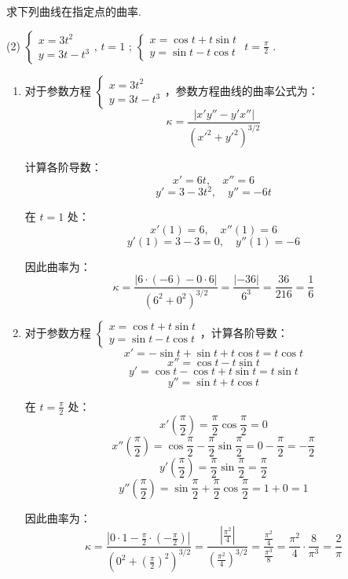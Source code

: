 \begin{exercise}[3.5.12]
    求下列曲线在指定点的曲率.
    \begin{tasks}(2)
        \task $\begin{cases} x = 3t^2 \\ y = 3t - t^3 \end{cases}$,  $t = 1$ ;
        \task $\begin{cases} x = \cos t + t \sin t \\ y = \sin t - t \cos t \end{cases}$  $t = \frac{\pi}{2}$ .
    \end{tasks}
\end{exercise}

\begin{solution}
    \begin{enumerate}
        \item 对于参数方程 $\begin{cases} x = 3t^2 \\ y = 3t - t^3 \end{cases}$，参数方程曲线的曲率公式为：
              $$\kappa = \frac{|x'y'' - y'x''|}{(x'^2 + y'^2)^{3/2}}$$

              计算各阶导数：
              $$x' = 6t, \quad x'' = 6$$
              $$y' = 3 - 3t^2, \quad y'' = -6t$$

              在 $t = 1$ 处：
              $$x'(1) = 6, \quad x''(1) = 6$$
              $$y'(1) = 3 - 3 = 0, \quad y''(1) = -6$$

              因此曲率为：
              $$\kappa = \frac{|6 \cdot (-6) - 0 \cdot 6|}{(6^2 + 0^2)^{3/2}} = \frac{|-36|}{6^3} = \frac{36}{216} = \frac{1}{6}$$

        \item 对于参数方程 $\begin{cases} x = \cos t + t \sin t \\ y = \sin t - t \cos t \end{cases}$，计算各阶导数：
              $$x' = -\sin t + \sin t + t \cos t = t \cos t$$
              $$x'' = \cos t - t \sin t$$
              $$y' = \cos t - \cos t + t \sin t = t \sin t$$
              $$y'' = \sin t + t \cos t$$

              在 $t = \frac{\pi}{2}$ 处：
              $$x'\left(\frac{\pi}{2}\right) = \frac{\pi}{2} \cos\frac{\pi}{2} = 0$$
              $$x''\left(\frac{\pi}{2}\right) = \cos\frac{\pi}{2} - \frac{\pi}{2}\sin\frac{\pi}{2} = 0 - \frac{\pi}{2} = -\frac{\pi}{2}$$
              $$y'\left(\frac{\pi}{2}\right) = \frac{\pi}{2} \sin\frac{\pi}{2} = \frac{\pi}{2}$$
              $$y''\left(\frac{\pi}{2}\right) = \sin\frac{\pi}{2} + \frac{\pi}{2}\cos\frac{\pi}{2} = 1 + 0 = 1$$

              因此曲率为：
              $$\kappa = \frac{\left|0 \cdot 1 - \frac{\pi}{2} \cdot \left(-\frac{\pi}{2}\right)\right|}{\left(0^2 + \left(\frac{\pi}{2}\right)^2\right)^{3/2}} = \frac{\left|\frac{\pi^2}{4}\right|}{\left(\frac{\pi^2}{4}\right)^{3/2}} = \frac{\frac{\pi^2}{4}}{\frac{\pi^3}{8}} = \frac{\pi^2}{4} \cdot \frac{8}{\pi^3} = \frac{2}{\pi}$$
    \end{enumerate}
\end{solution}

